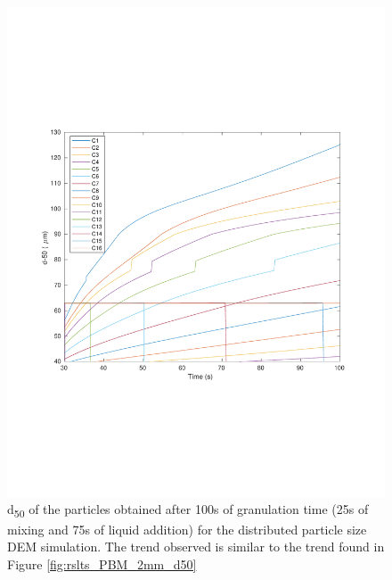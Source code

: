 \documentclass[preprint,11pt,authoryear]{elsarticle}
\begin{document}
\begin{figure}
\centering
\includegraphics[scale=0.5]{rslts_pbm_d50_128_555.pdf}
\caption{d\textsubscript{50} of the particles obtained after 100s of granulation time (25s of mixing and 75s of 
liquid addition) for the distributed particle size DEM simulation. The trend observed is similar to the trend 
found in Figure \ref{fig:rslts_PBM_2mm_d50}}
\label{fig:rslts_PBM_psd_d50}
\end{figure}
\end{document}
